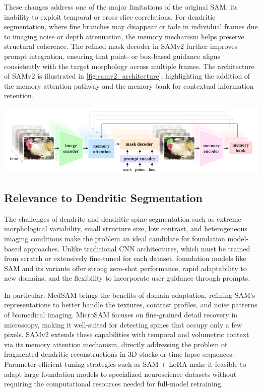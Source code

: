 These changes address one of the major limitations of the original \gls{SAM}: its inability to exploit temporal or cross-slice correlations. For dendritic segmentation, where fine branches may disappear or fade in individual frames due to imaging noise or depth attenuation, the memory mechanism helps preserve structural coherence. The refined mask decoder in \gls{SAMv2} further improves prompt integration, ensuring that point- or box-based guidance aligns consistently with the target morphology across multiple frames. The architecture of \gls{SAMv2} is illustrated in \autoref{fig:samv2_architecture}, highlighting the addition of the memory attention pathway and the memory bank for contextual information retention.

\begin{center}
    \includegraphics[width=.9\textwidth]{figures/13_SAM2.png} 
    \label{fig:samv2_architecture}
\end{center}

\subsection{Relevance to Dendritic Segmentation}
The challenges of dendrite and dendritic spine segmentation such as extreme morphological variability, small structure size, low contrast, and heterogeneous imaging conditions make the problem an ideal candidate for foundation model-based approaches. Unlike traditional \gls{CNN} architectures, which must be trained from scratch or extensively fine-tuned for each dataset, foundation models like \gls{SAM} and its variants offer strong zero-shot performance, rapid adaptability to new domains, and the flexibility to incorporate user guidance through prompts.

In particular, MedSAM brings the benefits of domain adaptation, refining \gls{SAM}’s representations to better handle the textures, contrast profiles, and noise patterns of biomedical imaging. MicroSAM focuses on fine-grained detail recovery in microscopy, making it well-suited for detecting spines that occupy only a few pixels. \gls{SAMv2} extends these capabilities with temporal and volumetric context via its memory attention mechanism, directly addressing the problem of fragmented dendritic reconstructions in 3D stacks or time-lapse sequences. Parameter-efficient tuning strategies such as \gls{SAM} + \gls{LoRA} make it feasible to adapt large foundation models to specialized neuroscience datasets without requiring the computational resources needed for full-model retraining.

